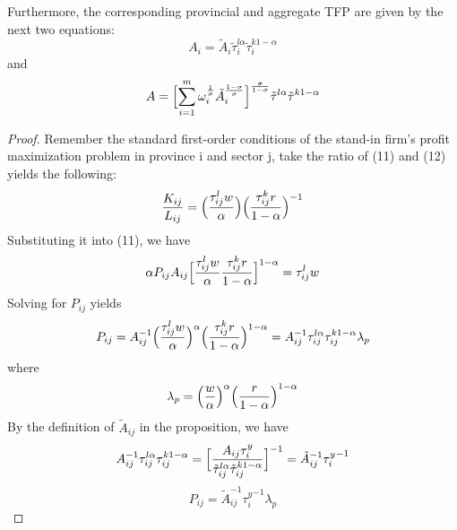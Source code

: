 \documentclass{article}
\begin{document}
\begin{prop}
\begin{equation*}
    \end{equation*}
    Furthermore, the corresponding provincial and aggregate TFP are given by the next two equations:
    \begin{equation*}
        A_i=\tilde{A}_i \tilde{\tau}_{i}^{l\alpha} \tilde{\tau}_{i}^{k 1-\alpha}
    \end{equation*}
    and
    \begin{equation*}
        A=\Bigl[  \sum_{i=1}^m \omega_i^{\frac{1}{\sigma}} \tilde{A}_i^{\frac{1-\sigma}{\sigma}} \Bigr]^{\frac{\sigma}{1-\sigma}} \tilde{\tau}^{l\alpha} \tilde{\tau}^{k 1-\alpha}
    \end{equation*}
\end{prop}

\begin{proof}
    Remember the standard first-order conditions of the stand-in firm's profit maximization problem in province i and sector j, take the ratio of (11) and (12) yields the following:
    \begin{equation}
        \frac{K_{ij}}{L_{ij}}=\Bigl( \frac{\tau_{ij}^l w}{\alpha} \Bigr) \Bigl( \frac{\tau_{ij}^k r}{1-\alpha} \Bigr)^{-1}
    \end{equation}
    Substituting it into (11), we have
    \begin{equation*}
        \alpha P_{ij} A_{ij} \Bigl[ \frac{\tau_{ij}^l w}{\alpha} \frac{\tau_{ij}^k r}{1-\alpha} \Bigr]^{1-\alpha}=\tau_{ij}^l w
    \end{equation*}
    Solving for $P_{ij}$ yields
    \begin{equation*}
        P_{ij}=A_{ij}^{-1} \Bigl( \frac{\tau_{ij}^l w}{\alpha} \Bigr)^\alpha \Bigl( \frac{\tau_{ij}^k r}{1-\alpha} \Bigr)^{1-\alpha}=A_{ij}^{-1} \tau_{ij}^{l\alpha} \tau_{ij}^{k 1-\alpha} \lambda_p
    \end{equation*}
    where
    \begin{equation*}
        \lambda_p=\Bigl( \frac{w}{\alpha} \Bigr)^\alpha \Bigl( \frac{r}{1-\alpha} \Bigr)^{1-\alpha}
    \end{equation*}
    By the definition of $\tilde{A}_{ij}$ in the proposition, we have
    \begin{equation*}
        A_{ij}^{-1} \tau_{ij}^{l\alpha} \tau_{ij}^{k 1-\alpha}= \Bigl[\frac{A_{ij}\tau_i^{y}}{\tilde{\tau}_{ij}^{l\alpha} \tilde{\tau}_{ij}^{k 1-\alpha}} \Bigr]^{-1}=\tilde{A}_{ij}^{-1} {\tau_i^{y}}^{-1}
    \end{equation*}
    \begin{equation}
        P_{ij}=\tilde{A}_{ij}^{-1} {\tau_i^{y}}^{-1} \lambda_p

\end{equation}
\end{proof}
\end{document}
